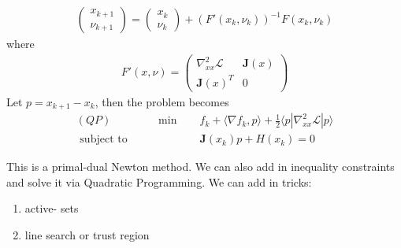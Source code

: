 \documentclass[class=article,crop=false]{standalone}
\begin{document}
\begin{align*}
	\begin{pmatrix} x_{k+1}\\ \nu_{k+1} \end{pmatrix} = \begin{pmatrix} x_k\\ \nu_k \end{pmatrix} + \left( F'(x_k,\nu_k) \right) ^{-1} F(x_k,\nu_k)
\end{align*}
where
\begin{align*}
	F'(x,\nu) = \begin{pmatrix} \nabla _{x x}^2 \mathscr{L}& \mathbf{J}(x)\\ \mathbf{J}(x)^{T}&0 \end{pmatrix} 
\end{align*}
Let $ p = x_{k+1} - x_k$, then the problem becomes
\begin{align*}
	(QP) \qquad \qquad 	\min \quad & f_k + \langle \nabla f_k, p \rangle + \frac{1}{2} \langle p|\nabla _{x x}^2 \mathscr{L}|p\rangle\\
	\text{ subject to} \quad & \mathbf{J}(x_k) p + H(x_k) = 0 
\end{align*}

This is a primal-dual Newton method. We can also add in inequality constraints and solve it via Quadratic Programming. We can add in tricks:
\begin{enumerate}[label=(\arabic*)]
	\item active- sets
	\item line search or trust region
\end{enumerate}
\end{document}
